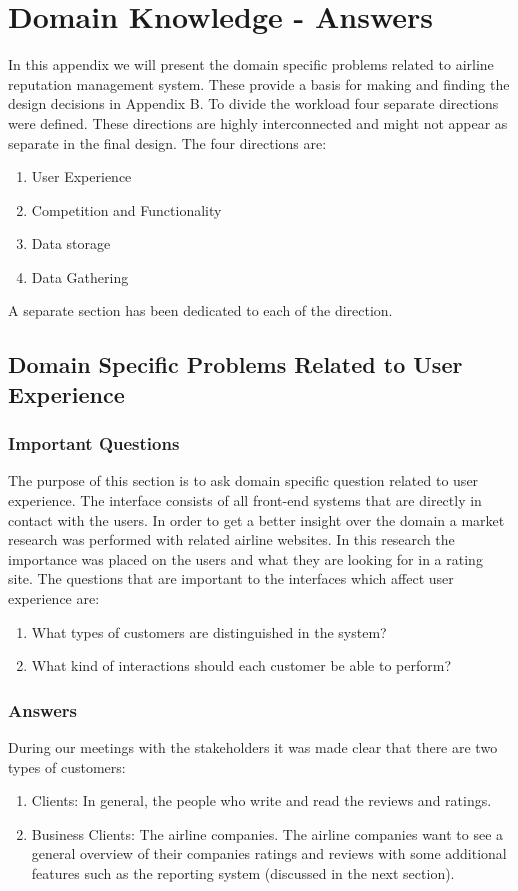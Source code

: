 
\section{Domain Knowledge - Answers}
In this appendix we will present the domain specific problems related to airline reputation management system. These provide a basis for making and finding the design decisions in Appendix B. 
To divide the workload four separate directions were defined. These directions are highly interconnected and might not appear as separate in the final design. The four directions are:
\begin{enumerate}
\item User Experience
\item Competition and Functionality
\item Data storage
\item Data Gathering
\end{enumerate}
A separate section has been dedicated to each of the direction. 

\subsection{Domain Specific Problems Related to User Experience}
\subsubsection{Important Questions}
The purpose of this section is to ask domain specific question related to user experience. The interface consists of all front-end systems that are directly in contact with the users. 
In order to get a better insight over the domain a market research was performed with related airline websites. In this research the importance was placed on the users and what they are looking for in a rating site. 
The questions that  are important to the interfaces which affect user experience are:
\begin{enumerate}
\item What types of customers are distinguished in the system?
\item What kind of interactions should each customer be able to perform?
\end{enumerate}

\subsubsection{Answers}
During our meetings with the stakeholders it was made clear that there are two types of customers:
\begin{enumerate} 
\item Clients: In general, the people who write and read the reviews and ratings.
\item Business Clients: The airline companies. The airline companies want to see a general overview of their companies ratings and reviews with some additional features such as the 
reporting system (discussed in the next section).
\end{enumerate}

